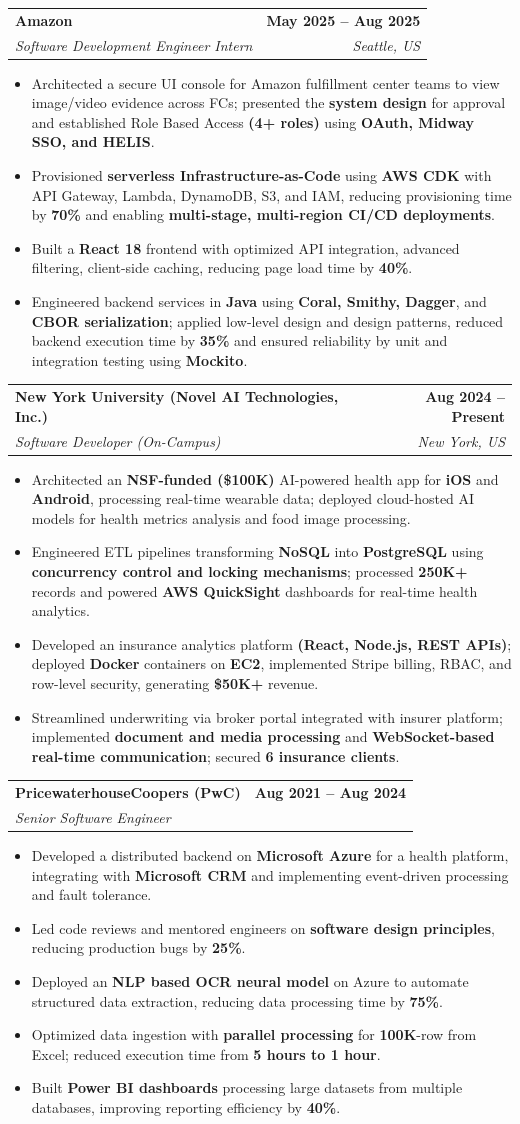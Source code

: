 \documentclass[letterpaper,10pt]{article}
\makeatletter
\newcommand{\resumeItem}[1]{
\item\small{{#1}\vspace{-3.5pt}}
}
\newcommand{\resumeSubheading}[4]{
\vspace{6pt}
\item
\begin{tabular*}{1.0\textwidth}[t]{l@{\extracolsep{\fill}}r}
\textbf{#1} & \textbf{\small #2} \\
\textit{\small#3} & \textit{\small #4} \\
\end{tabular*}\vspace{-5.5pt}
}
\newcommand{\resumeItemListStart}{\begin{itemize}[leftmargin=*, itemsep=0pt, topsep=0pt]}
\newcommand{\resumeItemListEnd}{\end{itemize}\vspace{-3pt}}
\makeatother
\begin{document}
\resumeSubheading
  {Amazon}{May 2025 -- Aug 2025}
  {Software Development Engineer Intern}{Seattle, US}
\resumeItemListStart
  \resumeItem{Architected a secure UI console for Amazon fulfillment center teams to view image/video evidence across FCs; presented the \textbf{system design} for approval and established Role Based Access \textbf{(4+ roles)} using \textbf{OAuth, Midway SSO, and HELIS}.}
  \resumeItem{Provisioned \textbf{serverless Infrastructure-as-Code} using \textbf{AWS CDK} with API Gateway, Lambda, DynamoDB, S3, and IAM, reducing provisioning time by \textbf{70\%} and enabling \textbf{multi-stage, multi-region CI/CD deployments}.}
  \resumeItem{Built a \textbf{React 18} frontend with optimized API integration, advanced filtering, client-side caching, reducing page load time by \textbf{40\%}.}
  \resumeItem{Engineered backend services in \textbf{Java} using \textbf{Coral, Smithy, Dagger}, and \textbf{CBOR serialization}; applied low-level design and design patterns, reduced backend execution time by \textbf{35\%} and ensured reliability by unit and integration testing using \textbf{Mockito}.}
\resumeItemListEnd

\resumeSubheading
  {New York University (Novel AI Technologies, Inc.)}{Aug 2024 -- Present}
  {Software Developer (On-Campus)}{New York, US}
\resumeItemListStart
  \resumeItem{Architected an \textbf{NSF-funded (\$100K)} AI-powered health app for \textbf{iOS} and \textbf{Android}, processing real-time wearable data; deployed cloud-hosted AI models for health metrics analysis and food image processing.}
  \resumeItem{Engineered ETL pipelines transforming \textbf{NoSQL} into \textbf{PostgreSQL} using \textbf{concurrency control and locking mechanisms}; processed \textbf{250K+} records and powered \textbf{AWS QuickSight} dashboards for real-time health analytics.}
  \resumeItem{Developed an insurance analytics platform \textbf{(React, Node.js, REST APIs)}; deployed \textbf{Docker} containers on \textbf{EC2}, implemented Stripe billing, RBAC, and row-level security, generating \textbf{\$50K+} revenue.}
  \resumeItem{Streamlined underwriting via broker portal integrated with insurer platform; implemented \textbf{document and media processing} and \textbf{WebSocket-based real-time communication}; secured \textbf{6 insurance clients}.}
\resumeItemListEnd

\resumeSubheading
  {PricewaterhouseCoopers (PwC)}{Aug 2021 -- Aug 2024}
  {Senior Software Engineer}{}
\resumeItemListStart
  \resumeItem{Developed a distributed backend on \textbf{Microsoft Azure} for a health platform, integrating with \textbf{Microsoft CRM} and implementing event-driven processing and fault tolerance.}
  \resumeItem{Led code reviews and mentored engineers on \textbf{software design principles}, reducing production bugs by \textbf{25\%}.}
  \resumeItem{Deployed an \textbf{NLP based OCR neural model} on Azure to automate structured data extraction, reducing data processing time by \textbf{75\%}.}
  \resumeItem{Optimized data ingestion with \textbf{parallel processing} for \textbf{100K}-row from Excel; reduced execution time from \textbf{5 hours to 1 hour}.}
  \resumeItem{Built \textbf{Power BI dashboards} processing large datasets from multiple databases, improving reporting efficiency by \textbf{40\%}.}
\resumeItemListEnd
\end{document}
